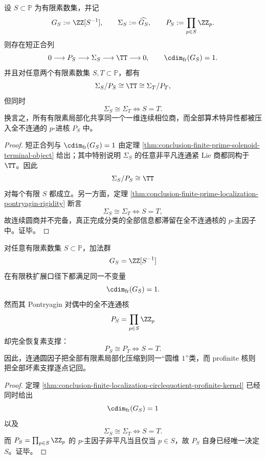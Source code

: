 \begin{theorem}[有限素局部化的一圆商与全不连通核分解]\label{thm:conclusion-finite-localization-circlequotient-profinite-kernel}
设 \(S\subset \mathbb P\) 为有限素数集，并记
\[
G_S:=\ZZ[S^{-1}],
\qquad
\Sigma_S:=\widehat{G_S},
\qquad
P_S:=\prod_{p\in S}\ZZ_p.
\]
则存在短正合列
\[
0\longrightarrow P_S\longrightarrow \Sigma_S\longrightarrow \TT\longrightarrow 0,
\qquad
\cdim_{\mathrm{fr}}(G_S)=1.
\]
并且对任意两个有限素数集 \(S,T\subset \mathbb P\)，都有
\[
\Sigma_S/P_S\cong \TT \cong \Sigma_T/P_T,
\]
但同时
\[
\Sigma_S\cong \Sigma_T
\iff
S=T.
\]
换言之，所有有限素局部化共享同一个一维连续相位商，而全部算术特异性都被压入全不连通的 \(p\)-进核 \(P_S\) 中。
\end{theorem}
\begin{proof}
短正合列与 \(\cdim_{\mathrm{fr}}(G_S)=1\) 由定理 \ref{thm:conclusion-finite-prime-solenoid-terminal-object} 给出；其中特别说明 \(\Sigma_S\) 的任意非平凡连通紧 Lie 商都同构于 \(\TT\)。因此
\[
\Sigma_S/P_S\cong \TT
\]
对每个有限 \(S\) 都成立。另一方面，定理 \ref{thm:conclusion-finite-prime-localization-pontryagin-rigidity} 断言
\[
\Sigma_S\cong \Sigma_T\iff S=T,
\]
故连续圆商并不完备，真正完成分类的全部信息都滞留在全不连通核的 \(p\)-主因子中。证毕。
\end{proof}

\begin{corollary}[局部化数系的圆维坍缩与素支撑完备]\label{cor:conclusion-finite-localization-circle-dimension-collapse-profinite-support-completeness}
对任意有限素数集 \(S\subset \mathbb P\)，加法群
\[
G_S=\ZZ[S^{-1}]
\]
在有限秩扩展口径下都满足同一不变量
\[
\cdim_{\mathrm{fr}}(G_S)=1.
\]
然而其 Pontryagin 对偶中的全不连通核
\[
P_S=\prod_{p\in S}\ZZ_p
\]
却完全恢复素支撑：
\[
P_S\cong P_T
\iff
S=T.
\]
因此，连通圆因子把全部有限素局部化压缩到同一“圆维 \(1\)”类，而 profinite 核则把全部坏素支撑逐点记回。
\end{corollary}
\begin{proof}
定理 \ref{thm:conclusion-finite-localization-circlequotient-profinite-kernel} 已经同时给出
\[
\cdim_{\mathrm{fr}}(G_S)=1
\]
以及
\[
\Sigma_S\cong \Sigma_T\iff S=T.
\]
而 \(P_S=\prod_{p\in S}\ZZ_p\) 的 \(p\)-主因子非平凡当且仅当 \(p\in S\)，故 \(P_S\) 自身已经唯一决定 \(S\)。证毕。
\end{proof}

